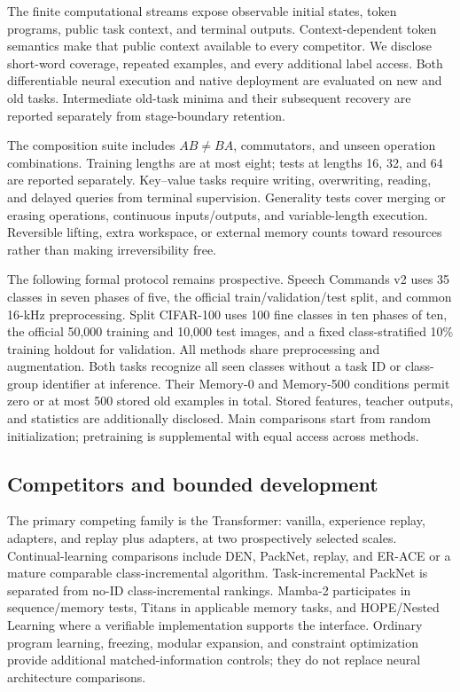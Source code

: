 The finite computational streams expose observable initial states, token
programs, public task context, and terminal outputs. Context-dependent token
semantics make that public context available to every competitor. We disclose
short-word coverage, repeated examples, and every additional label access.
Both differentiable neural execution and native deployment are evaluated on
new and old tasks. Intermediate old-task minima and their subsequent recovery
are reported separately from stage-boundary retention.

The composition suite includes $AB\ne BA$, commutators, and unseen operation
combinations. Training lengths are at most eight; tests at lengths 16, 32, and 64
are reported separately. Key--value tasks require writing, overwriting,
reading, and delayed queries from terminal supervision. Generality tests cover
merging or erasing operations, continuous inputs/outputs, and variable-length
execution. Reversible lifting, extra workspace, or external memory counts
toward resources rather than making irreversibility free.

The following formal protocol remains prospective. Speech Commands v2 uses 35 classes in seven phases of five, the official
train/validation/test split, and common 16-kHz preprocessing. Split CIFAR-100
uses 100 fine classes in ten phases of ten, the official 50,000 training and
10,000 test images, and a fixed class-stratified 10\% training holdout for
validation. All methods share preprocessing and augmentation. Both tasks
recognize all seen classes without a task ID or class-group identifier at
inference. Their Memory-0 and Memory-500 conditions permit zero or at most 500
stored old examples in total. Stored features, teacher outputs, and statistics
are additionally disclosed. Main comparisons start from random initialization;
pretraining is supplemental with equal access across methods.

\subsection{Competitors and bounded development}

The primary competing family is the Transformer: vanilla, experience replay,
adapters, and replay plus adapters, at two prospectively selected scales.
Continual-learning comparisons include DEN, PackNet, replay, and ER-ACE or a
mature comparable class-incremental algorithm. Task-incremental PackNet is
separated from no-ID class-incremental rankings. Mamba-2 participates in
sequence/memory tests, Titans in applicable memory tasks, and HOPE/Nested
Learning where a verifiable implementation supports the interface. Ordinary
program learning, freezing, modular expansion, and constraint optimization
provide additional matched-information controls; they do not replace neural
architecture comparisons.

